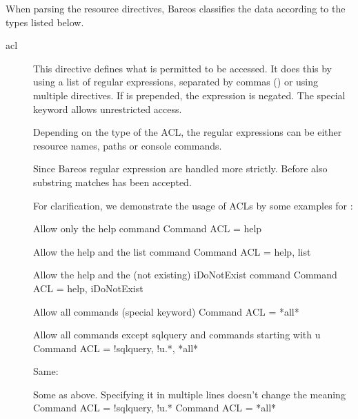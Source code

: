When parsing the resource directives, Bareos classifies the data according to
the types listed below.

\begin{description}

\item [acl]
    \label{DataTypeAcl}
This directive defines what is permitted to be accessed.
It does this by using a list of regular expressions, separated by commas (\argument{,})
or using multiple directives.
If \argument{!} is prepended, the expression is negated.
The special keyword  allows unrestricted access.

Depending on the type of the ACL, the regular expressions can be either resource names, paths or console commands.

Since Bareos  regular expression are handled more strictly. Before also substring matches has been accepted.

\label{sec:CommandAclExample}
For clarification, we demonstrate the usage of ACLs by some examples for :
\begin{bconfig}{Allow only the help command}
Command ACL = help
\end{bconfig}

\begin{bconfig}{Allow the help and the list command}
Command ACL = help, list
\end{bconfig}

\begin{bconfig}{Allow the help and the (not existing) iDoNotExist command}
Command ACL = help, iDoNotExist
\end{bconfig}

\begin{bconfig}{Allow all commands (special keyword)}
Command ACL = *all*
\end{bconfig}

\begin{bconfig}{Allow all commands except sqlquery and commands starting with u}
Command ACL = !sqlquery, !u.*, *all*
\end{bconfig}

Same:
\begin{bconfig}{Some as above. Specifying it in multiple lines doesn't change the meaning}
Command ACL = !sqlquery, !u.*
Command ACL = *all*
\end{bconfig}


\end{description}
